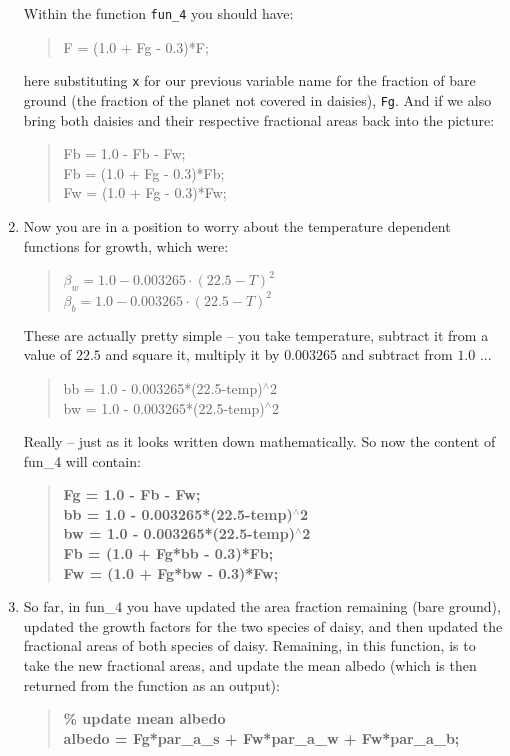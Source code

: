 \documentclass{tufte-book} %
\newenvironment{docspec}{\begin{quotation}\ttfamily\parskip0pt\parindent0pt\ignorespaces}{\end{quotation}}
\newenvironment{docspecbold}{\begin{quotation}\ttfamily\bfseries\parskip0pt\parindent0pt\ignorespaces}{\end{quotation}}
\begin{document}
\begin{enumerate}
Within the function \texttt{fun\_4} you should have:
\begin{docspec}
F = (1.0 + Fg - 0.3)*F;
\end{docspec}
here substituting \texttt{x} for our previous variable name for the fraction of bare ground (the fraction of the planet not covered in daisies), \texttt{Fg}.
  And if we also bring both daisies and their respective fractional areas back into the picture:
\begin{docspec}
Fb = 1.0 - Fb - Fw;\\
Fb = (1.0 + Fg - 0.3)*Fb;\\
Fw = (1.0 + Fg - 0.3)*Fw;\\
\end{docspec}

\item Now you are in a position to worry about the temperature dependent functions for growth, which were:
\begin{docspec}
\(\beta_{w} = 1.0-0.003265\cdot(22.5-T)^{2}\)
\\\(\beta_{b} = 1.0-0.003265\cdot(22.5-T)^{2}\)
\end{docspec}

These are actually pretty simple -- you take temperature, subtract it from a value of \(22.5\) and square it, multiply it by \(0.003265\) and subtract from \(1.0\) ...
\begin{docspec}
bb = 1.0 - 0.003265*(22.5-temp)\(^{\wedge}\)2\\
bw = 1.0 - 0.003265*(22.5-temp)\(^{\wedge}\)2
\end{docspec}
Really -- just as it looks written down mathematically. So now the content of \textsf{fun\_4} will contain:
\begin{docspecbold}
Fg = 1.0 - Fb - Fw;\\
bb = 1.0 - 0.003265*(22.5-temp)\(^{\wedge}\)2\\
bw = 1.0 - 0.003265*(22.5-temp)\(^{\wedge}\)2\\
Fb = (1.0 + Fg*bb - 0.3)*Fb;\\
Fw = (1.0 + Fg*bw - 0.3)*Fw;
\end{docspecbold}

\item So far, in \textsf{fun\_4} you have updated the  area fraction remaining (bare ground), updated the growth factors for the two species of daisy, and then updated the fractional areas of both species of daisy. Remaining, in this function, is to take the new fractional areas, and update the mean albedo (which is then returned from the function as an output):
\begin{docspecbold}
\textcolor[rgb]{0,0.501961,0}{\% update mean albedo\\}
albedo = Fg*par\_a\_s + Fw*par\_a\_w + Fw*par\_a\_b;
\end{docspecbold}


\end{enumerate}
\end{document}
